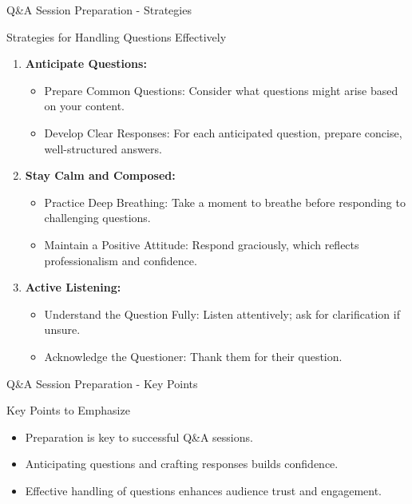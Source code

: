 \documentclass[aspectratio=169]{beamer}
\begin{document}
\begin{frame}[fragile]{Q\&A Session Preparation - Strategies}
    \begin{block}{Strategies for Handling Questions Effectively}
        \begin{enumerate}
            \item \textbf{Anticipate Questions:}
                \begin{itemize}
                    \item Prepare Common Questions: Consider what questions might arise based on your content.
                    \item Develop Clear Responses: For each anticipated question, prepare concise, well-structured answers.
                \end{itemize}

            \item \textbf{Stay Calm and Composed:}
                \begin{itemize}
                    \item Practice Deep Breathing: Take a moment to breathe before responding to challenging questions.
                    \item Maintain a Positive Attitude: Respond graciously, which reflects professionalism and confidence.
                \end{itemize}

            \item \textbf{Active Listening:}
                \begin{itemize}
                    \item Understand the Question Fully: Listen attentively; ask for clarification if unsure.
                    \item Acknowledge the Questioner: Thank them for their question.
                \end{itemize}
        \end{enumerate}
    \end{block}
\end{frame}

\begin{frame}[fragile]{Q\&A Session Preparation - Key Points}
    \begin{block}{Key Points to Emphasize}
        \begin{itemize}
            \item Preparation is key to successful Q\&A sessions.
            \item Anticipating questions and crafting responses builds confidence.
            \item Effective handling of questions enhances audience trust and engagement.
        \end{itemize}
    \end{block}
\end{frame}
\end{document}
